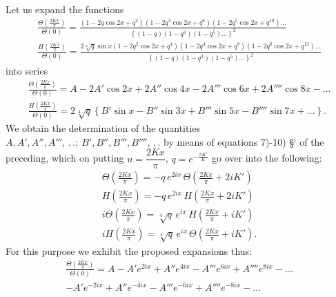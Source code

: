 \documentclass{article}
\begin{document}
Let us expand the functions
\[
\begin{gathered}
\frac{\Theta\left(\frac{2Kx}{\pi}\right)}{\Theta(0)}=\frac{(1-2q\cos 2x+q^{2})(1-2q^{3}\cos 2x+q^{6})(1-2q^{5}\cos 2x+q^{10})\ldots}{\left\{(1-q)(1-q^{3})(1-q^{5})\ldots\right\}^{2}}\\[2ex]
\frac{H\left(\frac{2Kx}{\pi}\right)}{\Theta(0)}=\frac{2\sqrt[4]{q}\sin x(1-2q^{2}\cos 2x+q^{4})(1-2q^{4}\cos 2x+q^{8})(1-2q^{6}\cos 2x+q^{12})\ldots}{\left\{(1-q)(1-q^{3})(1-q^{5})\ldots\right\}^{2}}
\end{gathered}
\]
into series
\[
\begin{gathered}
\frac{\Theta\left(\frac{2Kx}{\pi}\right)}{\Theta(0)}=A-2A'\cos 2x+2A''\cos 4x-2A'''\cos 6x+2A''''\cos 8x-\ldots\\[2ex]
\frac{H\left(\frac{2Kx}{\pi}\right)}{\Theta(0)}=2\sqrt[4]{q}\left\{B'\sin x-B''\sin 3x+B'''\sin 5x-B''''\sin 7x+\ldots\right\}.
\end{gathered}
\]
We obtain the determination of the quantities $A,A',A'',A''',\,.\,.;\ B',B'',B''',B'''',\,.\,.$ by means of equations 7)-10) §$^{\mathrm{i}}$ of the preceding, which on putting $u=\dfrac{2Kx}{\pi}$, $q=e^{-\frac{\pi K'}{K}}$ go over into the following:
\[
\begin{gathered}
\Theta\left(\frac{2Kx}{\pi}\right)=-q\,e^{2ix}\,\Theta\left(\frac{2Kx}{\pi}+2iK'\right)\\[2ex]
H\left(\frac{2Kx}{\pi}\right)=-q\,e^{2ix}\,H\left(\frac{2Kx}{\pi}+2iK'\right)\\[2ex]
i\Theta\left(\frac{2Kx}{\pi}\right)=\sqrt[4]{q}\,e^{ix}\,H\left(\frac{2Kx}{\pi}+iK'\right)\\[2ex]
iH\left(\frac{2Kx}{\pi}\right)=\sqrt[4]{q}\,e^{ix}\,\Theta\left(\frac{2Kx}{\pi}+iK'\right).
\end{gathered}
\]
For this purpose we exhibit the proposed expansions thus:
\[
\begin{gathered}
\frac{\Theta\left(\frac{2Kx}{\pi}\right)}{\Theta(0)}=A-A'e^{2ix}+A''e^{4ix}-A'''e^{6ix}+A''''e^{8ix}-\ldots\\[1.5ex]
-A'e^{-2ix}+A''e^{-4ix}-A'''e^{-6ix}+A''''e^{-8ix}-\ldots
\end{gathered}
\]
\end{document}
